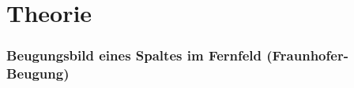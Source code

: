 \documentclass[../protokoll.tex]{subfiles}
\begin{document}
\part{Theorie}
\section{Beugungsbild eines Spaltes im Fernfeld (Fraunhofer-Beugung)}
\end{document}
